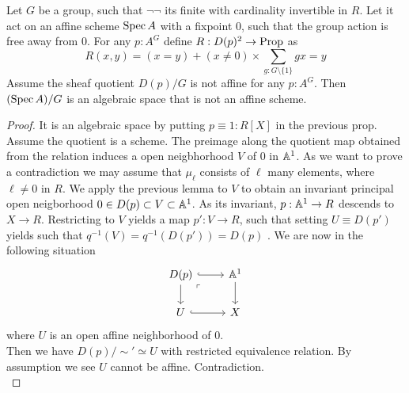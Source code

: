 \begin{prop}
	Let $G$ be a group, such that $\lnot \lnot$ its finite with cardinality invertible in $R$. Let it act on an affine scheme $\operatorname{Spec} A$ with a fixpoint 0, such that the group action is free away from 0.
	For any $p : A^G$ define $R: D(p)^2 \to \operatorname{Prop}$ as
	\[
	R(x,y) = (x = y) + (x \neq 0) \times \sum_{g : G \setminus \{1\}} g x = y
	\]
	Assume the sheaf quotient $D(p) / G$ is not affine for any $p : A^G$. Then $(\operatorname{Spec} A) / G$ is an algebraic space that is not an affine scheme.
\end{prop}
\begin{proof}
	It is an algebraic space by putting $p \equiv 1 : R[X]$ in the previous prop. \\
	Assume the quotient is a scheme. 
	The preimage along the quotient map obtained from the relation induces a open neigbhorhood $V$ of $0$ in $\mathbb{A}^1$. As we want to prove a contradiction we may assume that $\mu_\ell$ consists of $\ell$ many elements, where $\ell \neq 0 $ in $R$. We apply the previous lemma to $V$ to obtain an invariant principal open neigborhood $0 \in D(p) \subset V \subset \mathbb{A}^1$. As its invariant, $p : \mathbb{A}^1 \to R$ descends to $X \to R$. Restricting to $V$ yields a map $p' : V \to R$, such that setting $U \equiv D(p')$ yields such that $q^{-1}(V) =q^{-1}(D(p')) = D(p)$ . We are now in the following situation
	\[\begin{tikzcd}
		{D(p)} & {\bA^1} \\
		U & X
		\arrow[hook, from=1-1, to=1-2]
		\arrow[from=1-1, to=2-1]
		\arrow["\ulcorner"{anchor=center, pos=0.125}, draw=none, from=1-1, to=2-2]
		\arrow[from=1-2, to=2-2]
		\arrow[hook, from=2-1, to=2-2]
	\end{tikzcd}\]
	where $U$ is an open affine neighborhood of 0. \\
	Then we have $D(p) / \sim' \simeq U$ with restricted equivalence relation. By assumption we see $U$ cannot be affine. Contradiction.\\		
\end{proof}
